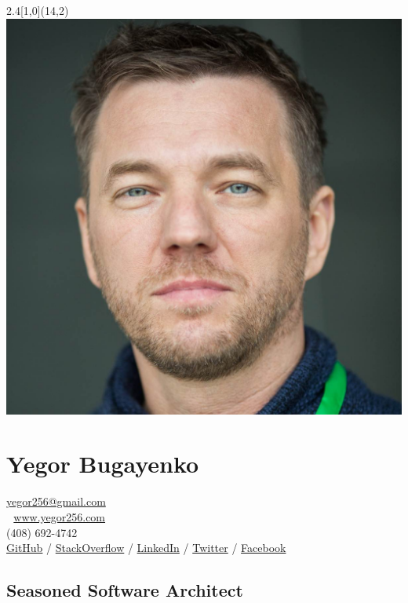 \documentclass[12pt]{article}
\begin{document}
\setlength{\topskip}{0mm}
\setlength{\parindent}{0pt}
\setlength{\parskip}{4pt}
\raggedright
{}

\begin{textblock}{2.4}[1,0](14,2){
  \includegraphics[width=\textwidth]{../images/face-1200x1200.jpg}
}\end{textblock}

\section*{Yegor Bugayenko}

\href{mailto:yegor256@gmail.com}{yegor256@gmail.com}\\ %
\href{http://www.yegor256.com}{www.yegor256.com}\\%
(408) 692-4742\\%
\href{https://github.com/yegor256}{GitHub} /
\href{https://stackexchange.com/users/63162/yegor256}{StackOverflow} /
\href{https://www.linkedin.com/in/yegor256}{LinkedIn} /
\href{https://twitter.com/intent/follow?screen_name=yegor256}{Twitter} /
\href{https://www.facebook.com/yegor256}{Facebook}

\subsection*{Seasoned Software Architect}
\end{document}
